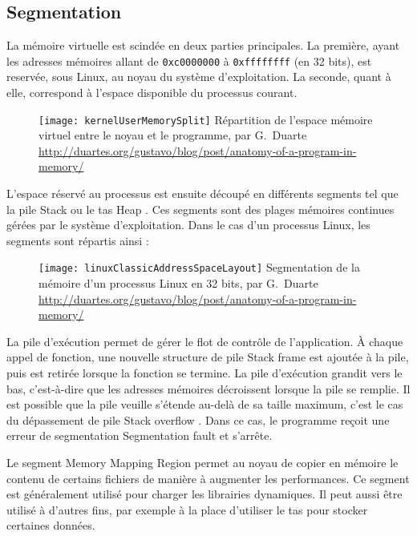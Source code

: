 \subsection{Segmentation}

La mémoire virtuelle est scindée en deux parties principales. La première, ayant les adresses mémoires allant de \texttt{0xc0000000} à \texttt{0xffffffff} (en 32 bits), est reservée, sous Linux, au noyau du système d'exploitation. La seconde, quant à elle, correspond à l'espace disponible du processus courant.

\begin{figure}[H]
	\centering
	\texttt{[image: kernelUserMemorySplit]}
	{Répartition de l'espace mémoire virtuel entre le noyau et le programme, par G.~Duarte}
	{\url{http://duartes.org/gustavo/blog/post/anatomy-of-a-program-in-memory/}}
	\label{fig:kernelUserMemorySplit}
\end{figure}

L'espace réservé au processus est ensuite découpé en différents segments tel que la pile \og Stack \fg ou le tas \og Heap \fg. Ces segments sont des plages mémoires continues gérées par le système d'exploitation. Dans le cas d'un processus Linux, les segments sont répartis ainsi :

\begin{figure}[H]
	\centering
	\texttt{[image: linuxClassicAddressSpaceLayout]}
	{Segmentation de la mémoire d'un processus Linux en 32 bits, par G.~Duarte}
	{\url{http://duartes.org/gustavo/blog/post/anatomy-of-a-program-in-memory/}}
	\label{fig:linuxClassicAddressSpaceLayout}
\end{figure}

\vfill

La pile d'exécution permet de gérer le flot de contrôle de l'application. À chaque appel de fonction, une nouvelle structure de pile \og Stack frame \fg est ajoutée à la pile, puis est retirée lorsque la fonction se termine. La pile d'exécution grandit vers le bas, c'est-à-dire que les adresses mémoires décroissent lorsque la pile se remplie. Il est possible que la pile veuille s'étende au-delà de sa taille maximum, c'est le cas du dépassement de pile \og Stack overflow \fg. Dans ce cas, le programme reçoit une erreur de segmentation \og Segmentation fault \fg et s'arrête.

Le segment \og Memory Mapping Region \fg permet au noyau de copier en mémoire le contenu de certains fichiers de manière à augmenter les performances. Ce segment est généralement utilisé pour charger les librairies dynamiques. Il peut aussi être utilisé à d'autres fins, par exemple à la place d'utiliser le tas pour stocker certaines données.

